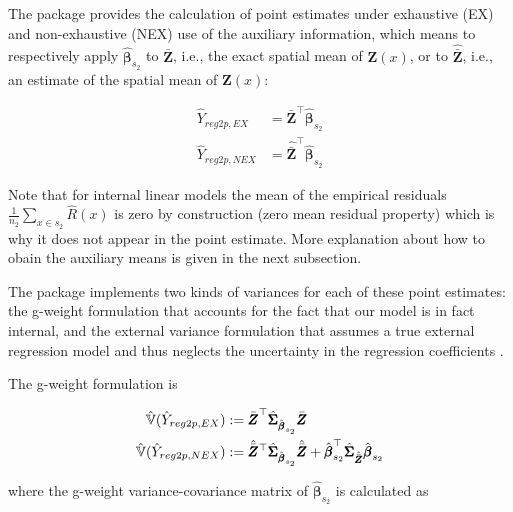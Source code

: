 The package provides the calculation of point estimates under exhaustive (EX) and non-exhaustive (NEX) use of the auxiliary information, which means to respectively apply $\hat{\pmb{\beta}}_{s_2}$ to $\bar{\pmb{Z}}$, i.e., the exact spatial mean of $\pmb{Z}(x)$, or to $\hat{\bar{\pmb{Z}}}$, i.e., an estimate of the spatial mean of $\pmb{Z}(x)$:


\begin{subequations}\label{eq:pointest_2p_reg}
\begin{align}
  \hat{Y}_{reg2p,EX} & =\bar{\pmb{Z}}^{\top}\hat{\pmb{\beta}}_{s_2} \label{eq:pointest_2p_reg_ex}\\
  \hat{Y}_{reg2p,NEX} & =\hat{\bar{\pmb{Z}}}^{\top}\hat{\pmb{\beta}}_{s_2} \label{eq:pointest_2p_reg_nex}
\end{align}
\end{subequations}

Note that for internal linear models the mean of the empirical residuals $\frac{1}{n_2}\sum_{x\in{s_2}}\hat{R}(x)$ is zero by construction (zero mean residual property) which is why it does not appear in the point estimate. More explanation about how to obain the auxiliary means is given in the next subsection.

The  package implements two kinds of variances for each of these point estimates: the g-weight formulation that accounts for the fact that our model is in fact internal, and the external variance formulation that assumes a true external regression model and thus neglects the uncertainty in the regression coefficients \citep{mandallaz2016}.

The g-weight formulation is

\begin{subequations}\label{eq:gw_var_2p_reg}
\begin{align}
  \hat{\mathbb{V}}(\hat{Y}_{reg2p,EX}) & :=\bar{\pmb{Z}}^{\top}\hat{\pmb{\Sigma}}_{\hat{\pmb{\beta}}_{s_2}}\bar{\pmb{Z}} \label{eq:gw_var_2p_reg_ex}\\
  \hat{\mathbb{V}}(\hat{Y}_{reg2p,NEX}) & :=
  \hat{\bar{\pmb{Z}}}^{\top}\hat{\pmb{\Sigma}}_{\hat{\pmb{\beta}}_{s_2}}\hat{\bar{\pmb{Z}}}
  + \hat{\pmb{\beta}}_{s_2}^{\top}\hat{\pmb{\Sigma}}_{\hat{\bar{\pmb{Z}}}}\hat{\pmb{\beta}}_{s_2} \label{eq:gw_var_2p_reg_nex}
\end{align}
\end{subequations}

where the g-weight variance-covariance matrix of $\hat{\pmb{\beta}}_{s_2}$ is calculated as


